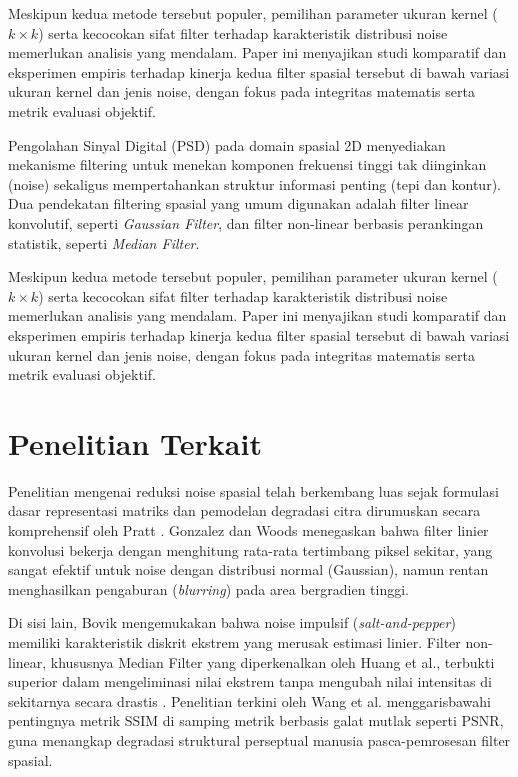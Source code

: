 \documentclass[conference,a4paper]{IEEEtran}
\begin{document}
Meskipun kedua metode tersebut populer, pemilihan parameter ukuran kernel ($k \times k$) serta kecocokan sifat filter terhadap karakteristik distribusi noise memerlukan analisis yang mendalam. Paper ini menyajikan studi komparatif dan eksperimen empiris terhadap kinerja kedua filter spasial tersebut di bawah variasi ukuran kernel dan jenis noise, dengan fokus pada integritas matematis serta metrik evaluasi objektif.

Pengolahan Sinyal Digital (PSD) pada domain spasial 2D menyediakan mekanisme filtering untuk menekan komponen frekuensi tinggi tak diinginkan (noise) sekaligus mempertahankan struktur informasi penting (tepi dan kontur). Dua pendekatan filtering spasial yang umum digunakan adalah filter linear konvolutif, seperti \textit{Gaussian Filter}, dan filter non-linear berbasis perankingan statistik, seperti \textit{Median Filter}.

Meskipun kedua metode tersebut populer, pemilihan parameter ukuran kernel ($k \times k$) serta kecocokan sifat filter terhadap karakteristik distribusi noise memerlukan analisis yang mendalam. Paper ini menyajikan studi komparatif dan eksperimen empiris terhadap kinerja kedua filter spasial tersebut di bawah variasi ukuran kernel dan jenis noise, dengan fokus pada integritas matematis serta metrik evaluasi objektif.

\section{Penelitian Terkait}
Penelitian mengenai reduksi noise spasial telah berkembang luas sejak formulasi dasar representasi matriks dan pemodelan degradasi citra dirumuskan secara komprehensif oleh Pratt \cite{pratt2007}. Gonzalez dan Woods \cite{gonzalez2018} menegaskan bahwa filter linier konvolusi bekerja dengan menghitung rata-rata tertimbang piksel sekitar, yang sangat efektif untuk noise dengan distribusi normal (Gaussian), namun rentan menghasilkan pengaburan (\textit{blurring}) pada area bergradien tinggi.

Di sisi lain, Bovik \cite{bovik2005} mengemukakan bahwa noise impulsif (\textit{salt-and-pepper}) memiliki karakteristik diskrit ekstrem yang merusak estimasi linier. Filter non-linear, khususnya Median Filter yang diperkenalkan oleh Huang et al., terbukti superior dalam mengeliminasi nilai ekstrem tanpa mengubah nilai intensitas di sekitarnya secara drastis \cite{huang1979}. Penelitian terkini oleh Wang et al. \cite{wang2004ssim} menggarisbawahi pentingnya metrik SSIM di samping metrik berbasis galat mutlak seperti PSNR, guna menangkap degradasi struktural perseptual manusia pasca-pemrosesan filter spasial.
\end{document}

